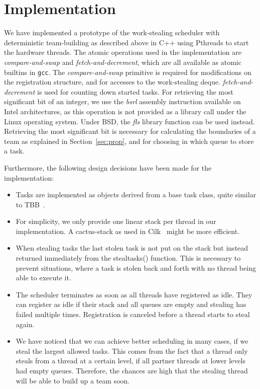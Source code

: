 \documentclass[preprint]{sigplanconf}
\begin{document}
\section{Implementation}
\label{sec:implementation}

We have implemented a prototype of the work-stealing scheduler with
deterministic team-building as described above in C++ using Pthreads
to start the  hardware threads.  The atomic operations used in the
implementation are \emph{compare-and-swap} and
\emph{fetch-and-decrement}, which are all available as atomic builtins
in \texttt{gcc}. The \emph{compare-and-swap} primitive is required for
modifications on the registration structure, and for accesses to the
work-stealing deque. \emph{fetch-and-decrement} is used for counting
down started tasks. For retrieving the most significant bit of an
integer, we use the \emph{bsrl} assembly instruction available on
Intel architectures, as this operation is not provided as a library
call under the Linux operating system. Under BSD, the
\emph{fls} library function can be used instead. Retrieving the most
significant bit is necessary for calculating the boundaries of a team
as explained in Section~\ref{sec:prop}, and for choosing in which
queue to store a task.

Furthermore, the following design decisions have been made for the
implementation:

\begin{itemize}
\item Tasks are implemented as objects derived from a base task class,
quite similar to TBB~\cite{KukanovVoss07}.
\item For simplicity, we only provide one linear stack per thread in
our implementation. A cactus-stack as used in
Cilk~\cite{BlumofeJoergKuszmaulLeisersonRandallZhou96} might be more
efficient.
\item When stealing tasks the last stolen task is not put on the
stack but instead returned immediately from the stealtasks()
function. This is necessary to prevent situations, where a task is
stolen back and forth with no thread being able to execute it.
\item The scheduler terminates as soon as all threads have registered
as idle. They can register as idle if their stack and all queues are
empty and stealing has failed multiple times. Registration is
canceled before a thread starts to steal again.
\item
We have noticed that we can achieve better scheduling in many
cases, if we steal the largest allowed tasks. This comes from the fact
that a thread only steals from a thread at a certain level, if all
partner threads at lower levels had empty queues. Therefore, the
chances are high that the stealing thread will be able to build up a
team soon.
\end{itemize}
\end{document}
